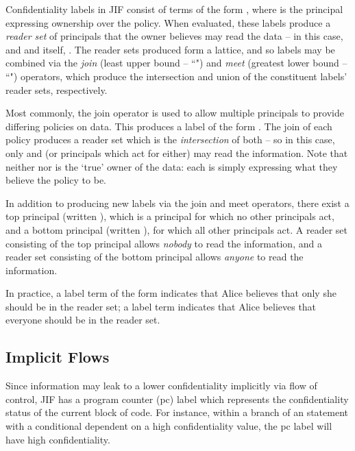Confidentiality labels in JIF consist of terms of the form , where  is the principal expressing ownership over the policy. When evaluated, these labels produce a \textit{reader set} of principals that the owner believes may read the data -- in this case,  and  and itself, . The reader sets produced form a lattice, and so labels may be combined via the \textit{join} (least upper bound -- ``\mono{;}") and \textit{meet} (greatest lower bound -- ``") operators, which produce the intersection and union of the constituent labels' reader sets, respectively.

Most commonly, the join operator is used to allow multiple principals to provide differing policies on data. This produces a label of the form . The join of each policy produces a reader set which is the \textit{intersection} of both -- so in this case, only  and  (or principals which act for either) may read the information. Note that neither  nor  is the `true' owner of the data: each is simply expressing what they believe the policy to be.

In addition to producing new labels via the join and meet operators, there exist a top principal (written \mono{*}), which is a principal for which no other principals act, and a bottom principal (written \mono{\_}), for which all other principals act. A reader set consisting of the top principal allows \textit{nobody} to read the information, and a reader set consisting of the bottom principal allows \textit{anyone} to read the information.

In practice, a label term of the form  indicates that Alice believes that only she should be in the reader set; a label term  indicates that Alice believes that everyone should be in the reader set.

\subsection{Implicit Flows}

Since information may leak to a lower confidentiality implicitly via flow of control, JIF has a program counter (pc) label which represents the confidentiality status of the current block of code. For instance, within a branch of an  statement with a conditional dependent on a high confidentiality value, the pc label will have high confidentiality.

